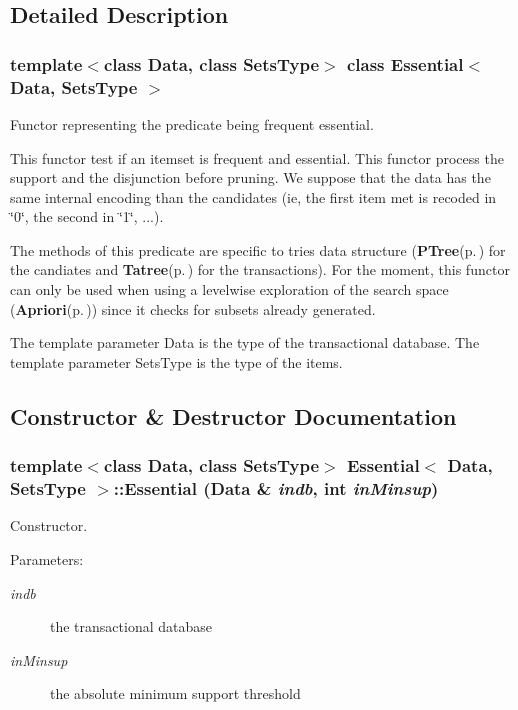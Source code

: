 \subsection{Detailed Description}
\subsubsection*{template$<$class Data, class Sets\-Type$>$ class Essential$<$ Data, Sets\-Type $>$}

Functor representing the predicate being frequent essential. 

This functor test if an itemset is frequent and essential. This functor process the support and the disjunction before pruning. We suppose that the data has the same internal encoding than the candidates (ie, the first item met is recoded in \char`\"{}0\char`\"{}, the second in \char`\"{}1\char`\"{}, ...).

The methods of this predicate are specific to tries data structure ({\bf PTree}{\rm (p.\,\pageref{class_p_tree})} for the candiates and {\bf Tatree}{\rm (p.\,\pageref{class_tatree})} for the transactions). For the moment, this functor can only be used when using a levelwise exploration of the search space ({\bf Apriori}{\rm (p.\,\pageref{class_apriori})}) since it checks for subsets already generated.

The template parameter Data is the type of the transactional database. The template parameter Sets\-Type is the type of the items. 



\subsection{Constructor \& Destructor Documentation}
\subsubsection{\setlength{\rightskip}{0pt plus 5cm}template$<$class Data, class Sets\-Type$>$ {\bf Essential}$<$ Data, Sets\-Type $>$::{\bf Essential} (Data \& {\em indb}, int {\em in\-Minsup})\hspace{0.3cm}{\tt  [inline]}}\label{class_essential_c47b2c4a5a736b4f0d6d6da070d3f3ed}


Constructor. 

\begin{Desc}
\item[Parameters:]
\begin{description}
\item[{\em indb}]the transactional database \item[{\em in\-Minsup}]the absolute minimum support threshold \end{description}
\end{Desc}


